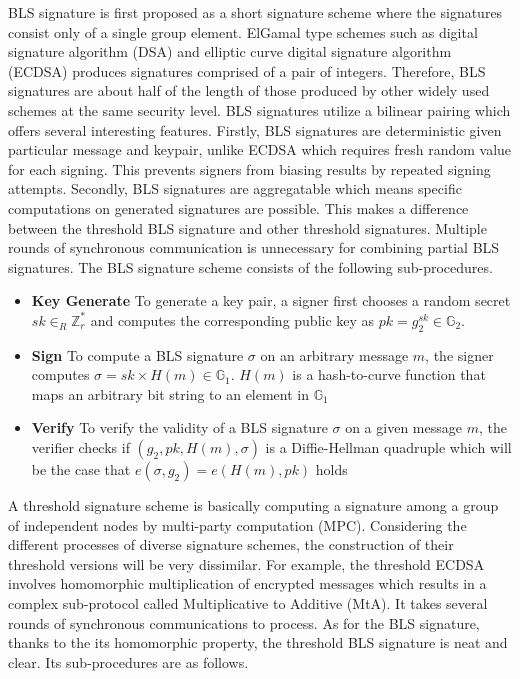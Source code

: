 \documentclass[11pt]{article}
\begin{document}
BLS signature is first proposed as a short signature scheme where the signatures consist only of a single group element. ElGamal type schemes such as digital signature algorithm (DSA) and elliptic curve digital signature algorithm (ECDSA) produces signatures comprised of a pair of integers. Therefore, BLS signatures are about half of the length of those produced by other widely used schemes at the same security level\cite{menezes2009introduction}. BLS signatures utilize a bilinear pairing which offers several interesting features. Firstly, BLS signatures are deterministic given particular message and keypair, unlike ECDSA which requires fresh random value for each signing. This prevents signers from biasing results by repeated signing attempts. Secondly, BLS signatures are aggregatable which means specific computations on generated signatures are possible. This makes a difference between the threshold BLS signature and other threshold signatures. Multiple rounds of synchronous communication is unnecessary for combining partial BLS signatures. The BLS signature scheme consists of the following sub-procedures.
\begin{itemize}
    \item[] \textbf{Key Generate} To generate a key pair, a signer first chooses a random secret $sk \in_R \mathbb{Z}_r^*$ and computes the corresponding public key as $pk = g_2^{sk} \in \mathbb{G}_2$.
    \item[] \textbf{Sign} To compute a BLS signature $\sigma$ on an arbitrary message $m$, the signer computes $\sigma = sk \times H(m) \in \mathbb{G}_1$. $H(m)$ is a hash-to-curve function that maps an arbitrary bit string to an element in $\mathbb{G}_1$
    \item[] \textbf{Verify} To verify the validity of a BLS signature $\sigma$ on a given message $m$, the verifier checks if $(g_2,pk,H(m),\sigma)$ is a Diffie-Hellman quadruple which will be the case that $e(\sigma,g_2)=e(H(m),pk)$ holds
\end{itemize}

A threshold signature scheme is basically computing a signature among a group of independent nodes by multi-party computation (MPC). Considering the different processes of diverse signature schemes, the construction of their threshold versions will be very dissimilar. For example, the threshold ECDSA involves homomorphic multiplication of encrypted messages which results in a complex sub-protocol called Multiplicative to Additive (MtA). It takes several rounds of synchronous communications to process. As for the BLS signature, thanks to the its homomorphic property, the threshold BLS signature is neat and clear. Its sub-procedures are as follows.
\end{document}
